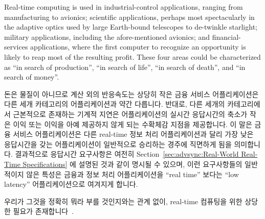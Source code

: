 Real-time computing is used in industrial-control applications, ranging from
manufacturing to avionics;
scientific applications, perhaps most spectacularly in the adaptive
optics used by
large Earth-bound telescopes to de-twinkle starlight;
military applications, including the afore-mentioned avionics;
and financial-services applications, where the first computer to recognize
an opportunity is likely to reap most of the resulting profit.
These four areas could be characterized as ``in search of production'',
``in search of life'', ``in search of death'', and ``in search of money''.
\fi

돈은 물질이 아니므로 계산 외의 반응속도는 상당히 작은 금융 서비스
어플리케이션은 다른 세개 카테고리의 어플리케이션과 약간 다릅니다.
반대로, 다른 세개의 카테고리에서 근본적으로 존재하는 기계적 지연은
어플리케이션의 실시간 응답시간의 축소가 작은 이익 또는 이익을 아예 제공하지
않게 되는 수확체감 지점을 제공합니다.
이 말은 금융 서비스 어플리케이션은 다른 real-time 정보 처리 어플리케이션과 달리
가장 낮은 응답시간을 갖는 어플리케이션이 일반적으로 승리하는 경주에 직면하게
됨을 의미합니다.
결과적으로 응답시간 요구사항은 여전히
Section~\ref{sec:advsync:Real-World Real-Time Specifications} 에 설명된 것과
같이 명시될 수 있으며, 이런 요구사항들의 일반적이지 않은 특성은 금융과 정보
처리 어플리케이션을 ``real time'' 보다는 ``low latency'' 어플리케이션으로
여겨지게 합니다.

우리가 그것을 정확히 뭐라 부를 것인지와는 관계 없이, real-time 컴퓨팅을 위한
상당한 필요가 존재합니다~\cite{JeremyWPeters2006NYTDec11,BillInmon2007a}.

